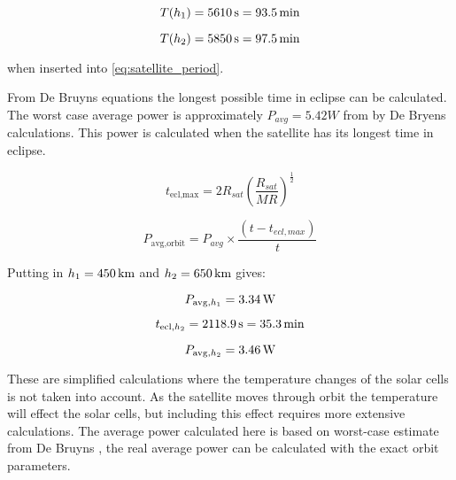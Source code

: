 \begin{equation}
T(h_1) = \unit[5610]{s} = \unit[93.5]{min}
\end{equation}

\begin{equation}
T(h_2) = \unit[5850]{s} = \unit[97.5]{min}
\end{equation}

when inserted into \autoref{eq:satellite_period}.

From De Bruyns equations \cite{Satellite Power Systems} the longest possible time in eclipse can be calculated. The worst case average power is approximately $P_{avg} = 5.42 W$ from by De Bryens calculations. This power is calculated when the satellite has its longest time in eclipse.

\begin{equation}
	t_{\text{ecl,max}} = 2R_{sat}\left(\frac{R_{sat}}{MR}\right)^{\frac{1}{2}}
	\label{Maximum time in eclipse}
\end{equation}

\begin{equation}
	P_{\text{avg,orbit}} = P_{avg}\times\frac{(t-t_{ecl,max})}{t}
	\label{Average effect during one orbit}
\end{equation}

Putting in $h_1 =\unit[450]{km}$ and $h_2 = \unit[650]{km}$ gives:


\begin{equation}
P_{\text{avg},h_1} = \unit[3.34]{W}
\end{equation}

\begin{equation}
t_{\text{ecl},h_2} = \unit[2118.9]{s} = \unit[35.3]{min}
\end{equation}

\begin{equation}
P_{\text{avg},h_2} = \unit[3.46]{W}
\end{equation}

These are simplified calculations where the temperature changes of the solar cells is not taken into account. As the satellite moves through orbit the temperature will effect the solar cells, but including this effect requires more extensive calculations. The average power calculated here is based on worst-case estimate from De Bruyns \cite{Satellite Power Systems}, the real average power can be calculated with the exact orbit parameters. 

